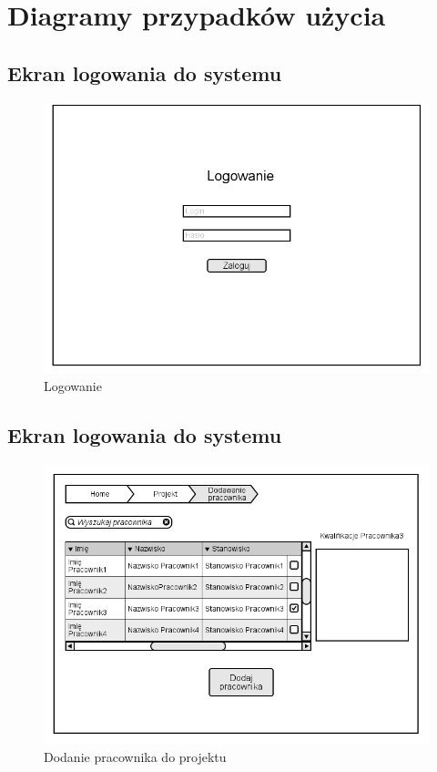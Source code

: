 \section{Diagramy przypadków użycia}

\subsection{Ekran logowania do systemu}
\begin{figure}[H]
    \centering
    \includegraphics[scale=0.7]{diagramy/intefejsy/Logowanie.png}
    \caption{Logowanie}
    \label{fig:usecase}
\end{figure}

\subsection{Ekran logowania do systemu}
\begin{figure}[H]
    \includegraphics[scale=0.7]{diagramy/intefejsy/Dodanie_pracownika_do_projektu.png}
    \caption{Dodanie pracownika do projektu}
    \label{fig:usecase}
\end{figure}

